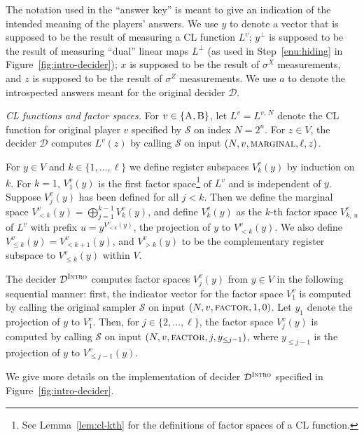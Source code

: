 \documentclass[11pt]{article}
\theoremstyle{definition}
\newcommand{\sampler}{\mathcal{S}}
\newcommand{\decider}{\mathcal{D}}
\newcommand{\gamestyle}[1]{\ensuremath{\textsc{#1}}\xspace}
\newcommand{\intro}{\gamestyle{Intro}}
\newcommand{\labelstyle}[1]{\ensuremath{\textsc{#1}}\xspace}
\newcommand{\trole}{\ensuremath{v}} %
\newcommand{\alice}{\labelstyle{A}}
\newcommand{\bob}{\labelstyle{B}}
\newcommand{\AB}{\{\alice, \bob\}}
\begin{document}
The notation used in the ``answer key'' is meant to give an indication of the
intended meaning of the players' answers.
We use $y$ to denote a vector that is supposed to be the result of measuring a
CL function $L^\trole$; $y^\perp$ is supposed to be the result of measuring
``dual'' linear maps $L^\perp$ (as used in Step~\ref{enu:hiding} in
Figure~\ref{fig:intro-decider}); $x$ is supposed to be the result of $\sigma^X$
measurements, and $z$ is supposed to be the result of $\sigma^Z$ measurements.
We use $a$ to denote the introspected answers meant for the original decider
$\decider$.

\medskip
\emph{CL functions and factor spaces.}
For $\trole \in \AB$, let $L^\trole = L^{\trole,\, N}$ denote the CL function
for original player $\trole$ specified by $\sampler$ on index $N = 2^n$.
For $z \in V$, the decider $\decider$ computes $L^\trole(z)$ by calling
$\sampler$ on input $(N, \trole, \gamestyle{marginal}, \ell, z)$.

For $y \in V$ and $k \in \{1,\ldots,\ell\}$ we define register subspaces
$V_{k}^\trole (y)$ by induction on $k$.
For $k=1$, $V_1^\trole(y)$ is the first factor space\footnote{See
  Lemma~\ref{lem:cl-kth} for the definitions of factor spaces of a CL function.}
of $L^\trole$ and is independent of $y$.
Suppose $V_j^\trole(y)$ has been defined for all $j < k$.
Then we define the marginal space $V_{< k}^\trole(y) = \bigoplus_{j=1}^{k-1}
V_k^\trole(y)$, and define $V_k^\trole(y)$ as the $k$-th factor space $V_{k,\,
  u}^\trole$ of $L^\trole$ with prefix $u = y^{V_{<k}^\trole(y)}$, the
projection of $y$ to $V_{<k}^\trole(y)$.
We also define $V^\trole_{\leq k}(y) = V^\trole_{< k+1}(y)$, and $V^\trole_{>
  k}(y)$ to be the complementary register subspace to $V^\trole_{\leq k}(y)$
within $V$.

The decider $\decider^\intro$ computes factor spaces $V_j^\trole(y)$ from $y \in
V$ in the following sequential manner: first, the indicator vector for the
factor space $V^\trole_1$ is computed by calling the original sampler $\sampler$
on input $(N,\trole,\gamestyle{factor},1,0)$.
Let $y_1$ denote the projection of $y$ to $V^\trole_1$.
Then, for $j \in \{2,\ldots,\ell\}$, the factor space $V^\trole_j(y)$ is
computed by calling $\sampler$ on input $(N,\trole,\gamestyle{factor},j,y_{\le
  j-1})$, where $y_{\le j-1}$ is the projection of $y$ to $V^\trole_{\le
  j-1}(y)$.

We give more details on the implementation of decider $\decider^\intro$
specified in Figure~\ref{fig:intro-decider}.
\end{document}
